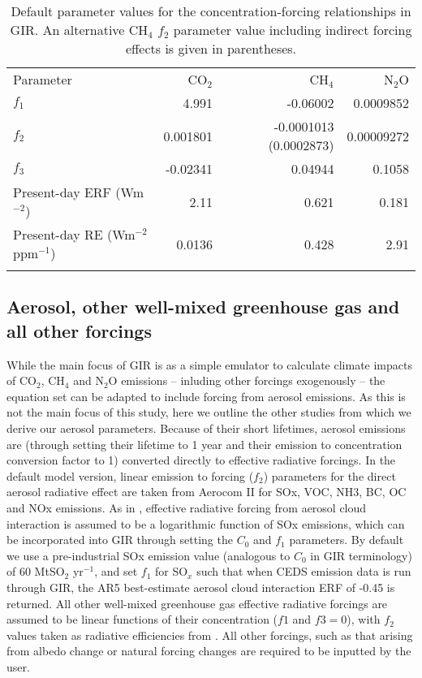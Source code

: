 \documentclass[gmd, manuscript]{copernicus}
\begin{document}
\begin{table}[t]
    \caption{Default parameter values for the concentration-forcing relationships in GIR. An alternative CH$_4$ $f_2$ parameter value including indirect forcing effects is given in parentheses.} \label{tab:forcparameters}
    \begin{tabular}{l r r r}
    \tophline
    Parameter & CO$_2$ & CH$_4$ & N$_2$O\\
    \middlehline
    $f_1$ & 4.991 & -0.06002 & 0.0009852 \\
    $f_2$ & 0.001801 & -0.0001013 (0.0002873) & 0.00009272 \\
    $f_3$ & -0.02341 & 0.04944 & 0.1058 \\
    \middlehline
    Present-day ERF (Wm$^{-2}$) & 2.11 & 0.621 & 0.181 \\
    Present-day RE (Wm$^{-2}$ppm$^{-1}$) & 0.0136 & 0.428 & 2.91 \\
    \bottomhline
    \end{tabular}
    \belowtable{} %
\end{table}

\subsection*{Aerosol, other well-mixed greenhouse gas and all other forcings}
While the main focus of GIR is as a simple emulator to calculate climate impacts of CO$_2$, CH$_4$ and N$_2$O emissions -- inluding other forcings exogenously -- the equation set can be adapted to include forcing from aerosol emissions. As this is not the main focus of this study, here we outline the other studies from which we derive our aerosol parameters. Because of their short lifetimes, aerosol emissions are (through setting their lifetime to 1 year and their emission to concentration conversion factor to 1) converted directly to effective radiative forcings. In the default model version, linear emission to forcing ($f_2$) parameters for the direct aerosol radiative effect are taken from Aerocom II \citep{Myhre2013a} for SOx, VOC, NH3, BC, OC and NOx emissions. As in \cite{Stevens2015}, effective radiative forcing from aerosol cloud interaction is assumed to be a logarithmic function of SOx emissions, which can be incorporated into GIR through setting the $C_0$ and $f_1$ parameters. By default we use a pre-industrial SOx emission value (analogous to $C_0$ in GIR terminology) of 60 MtSO$_2$ yr$^{-1}$, and set $f_1$ for SO$_x$ such that when CEDS emission data is run through GIR, the AR5 best-estimate aerosol cloud interaction ERF of -0.45 is returned. All other well-mixed greenhouse gas effective radiative forcings are assumed to be linear functions of their concentration ($f1$ and $f3 = 0$), with $f_2$ values taken as radiative efficiencies from \cite{Etminan}.  All other forcings, such as that arising from albedo change or natural forcing changes are required to be inputted by the user.
\end{document}
